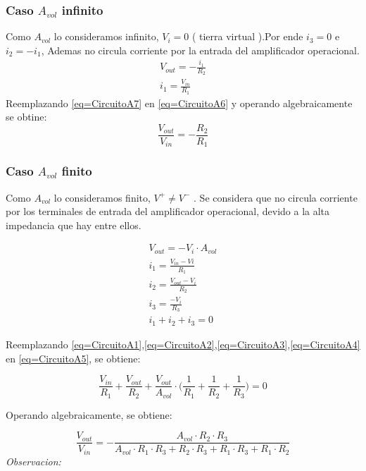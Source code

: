\documentclass[../../main.tex]{subfiles}
\begin{document}
\subsubsection{Caso $A_{vol}$ infinito}

Como $A_{vol}$ lo consideramos infinito, $V_{i}=0$ \big( tierra virtual \big).Por ende $i_{3}=0$ e $i_{2}=-i_{1}$, Ademas no circula corriente por la entrada del   amplificador operacional.
\begin{gather}
V_{out}=-\frac{i_{1}}{R_{2}}\label{eq=CircuitoA6}\\
i_{1}=\frac{V_{in}}{R_{1}}\label{eq=CircuitoA7}
\end{gather}
Reemplazando \ref{eq=CircuitoA7} en \ref{eq=CircuitoA6} y operando algebraicamente se obtine:
\begin{equation}
\frac{V_{out}}{V_{in}}= -\frac{R_{2}}{R_{1}} \label{eq=CircuitoAideal}
\end{equation}


\subsubsection{Caso $A_{vol}$ finito}

Como $A_{vol}$  lo consideramos finito, $V^{+}\neq V^{-}$ . Se considera que no circula corriente por  los terminales de entrada del amplificador operacional, devido a la alta impedancia que hay entre ellos.

\begin{gather}
V_{out}= -V_{i}\cdot A_{vol}\label{eq=CircuitoA1}\\
i_{1}=\frac{V_{in}-V{i}}{R_{1}}\label{eq=CircuitoA2}\\
i_{2}=\frac{V_{out}-V_{i}}{R_{2}}\label{eq=CircuitoA3}\\
i_{3}=\frac{-V_{i}}{R_{3}}\label{eq=CircuitoA4}\\
i_{1}+i_{2}+i_{3}=0\label{eq=CircuitoA5}
\end{gather}

Reemplazando \ref{eq=CircuitoA1},\ref{eq=CircuitoA2},\ref{eq=CircuitoA3},\ref{eq=CircuitoA4} en \ref{eq=CircuitoA5}, se obtiene:


$$\frac{V_{in}}{R_{1}} + \frac{V_{out}}{R_{2}}+\frac{V_{out}}{A_{vol}}\cdot \bigg( \frac{1}{R_{1}} + \frac{1}{R_{2}} + \frac{1}{R_{3}} \bigg) = 0$$

Operando algebraicamente, se obtiene:

\begin{equation}
\frac{V_{out}}{V_{in}}= - \frac{A_{vol} \cdot R_{2} \cdot R_{3}}{A_{vol}\cdot R_{1} \cdot R_{3} + R_{2} \cdot R_{3} +  R_{1} \cdot R_{3} + R_{1} \cdot R_{2} }\label{eq=gananciaAfinito}
\end{equation}
\textit{Observacion:}
\end{document}
